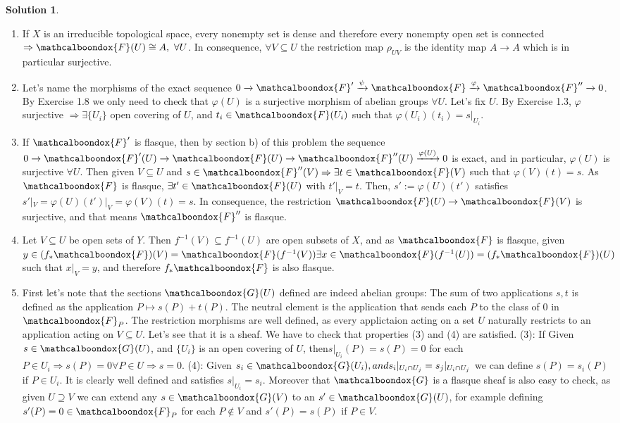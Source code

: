\documentclass[12pt]{article}
\newcommand{\imp}{\ensuremath{\Rightarrow}}
\theoremstyle{definition}
\newtheorem*{sol}{Solution}
\newcommand{\sF}{\ensuremath{\mathcalboondox{F}}}
\newcommand{\sG}{\ensuremath{\mathcalboondox{G}}}
\begin{document}
\begin{sol}
	\begin{enumerate}[label=\alph*)]
		\item If $X$ is an irreducible topological space, every nonempty set is dense and therefore every nonempty open set is connected $\imp \sF(U) \cong A, \, \, \forall U$. In consequence, $\forall V \subseteq U$ the restriction map $\rho_{UV}$ is the identity map $A \to A$ which is in particular surjective.

		\item Let's name the morphisms of the exact sequence $0 \xrightarrow[]{} \sF' \xrightarrow[]{\psi} \sF \xrightarrow[]{\varphi} \sF'' \xrightarrow[]{} 0$. By Exercise 1.8 we only need to check that $\varphi(U)$ is a surjective morphism of abelian groups $\forall U$. Let's fix $U$. By Exercise 1.3, $\varphi$ surjective $\imp \exists \{U_i\}$ open covering of $U$, and $t_i \in \sF(U_i)$ such that $\varphi(U_i)(t_i) = s|_{U_i}$.

		\item If $\sF'$ is flasque, then by section b) of this problem the sequence $0 \to \sF'(U) \to \sF(U) \to \sF''(U) \xrightarrow[]{\varphi(U)} 0$ is exact, and in particular, $\varphi(U)$ is surjective $\forall U$. Then given $V \subseteq U$ and $s \in \sF''(V) \imp \exists t \in \sF(V)$ such that $\varphi(V)(t) = s$. As $\sF$ is flasque, $\exists t' \in \sF(U)$ with $t'|_V = t$. Then, $s':= \varphi(U)(t')$ satisfies $s'|_{V} = \varphi(U)(t')|_V = \varphi(V)(t) = s$. In consequence, the restriction $\sF(U) \to \sF(V)$ is surjective, and that means $\sF''$ is flasque.

		\item Let $V \subseteq U$ be open sets of $Y$. Then $f^{-1}(V) \subseteq f^{-1}(U)$ are open subsets of $X$, and as $\sF$ is flasque, given $y \in (f_{*}\sF)(V) = \sF(f^{-1}(V)) \exists x \in \sF(f^{-1}(U)) = (f_{*}\sF)(U)$ such that $x|_V = y$, and therefore $f_{*}\sF$ is also flasque.

		\item First let's note that the sections $\sG(U)$ defined are indeed abelian groups: The sum of two applications $s,t$ is defined as the application $P \mapsto s(P) + t(P)$. The neutral element is the application that sends each $P$ to the class of 0 in $\sF_P$. The restriction morphisms are well defined, as every applictaion acting on a set $U$ naturally restricts to an application acting on $V \subseteq U$. Let's see that it is a sheaf. We have to check that properties (3) and (4) are satisfied. (3): If Given $s \in \sG(U)$, and $\{U_i\}$ is an open covering of $U$, then$s|_{U_i}(P) = s(P) = 0$ for each $P \in U_i \imp s(P) = 0 \forall P \in U \imp s = 0$. (4): Given $s_i \in \sG(U_i), and s_i|_{U_i \cap U_j} = s_j|_{U_i \cap U_j} $ we can define $s(P) = s_i(P)$ if $P \in U_i$. It is clearly well defined and satisfies $s|_{U_i} = s_i$.
		Moreover that $\sG$ is a flasque sheaf is also easy to check, as given $U \supseteq V$ we can extend any $s \in \sG(V)$ to an $s' \in \sG(U)$, for example defining $s'(P) = 0 \in \sF_P$ for each $P \notin V$ and $s'(P) = s(P)$ if $P \in V$.


\end{enumerate}
\end{sol}
\end{document}
